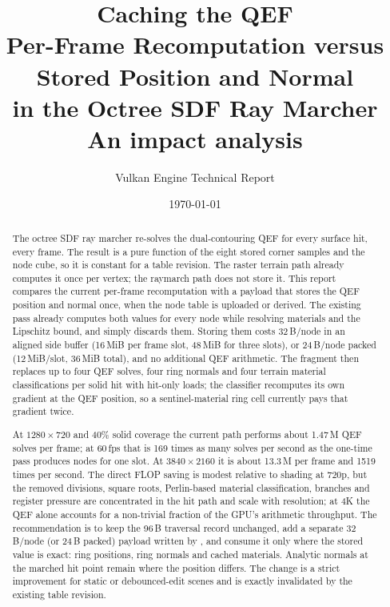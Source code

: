 \documentclass[11pt,a4paper]{article}
\title{\textbf{Caching the QEF}\\[6pt]
{\large Per-Frame Recomputation versus Stored Position and Normal\\
in the Octree SDF Ray Marcher}\\[8pt]
{\normalsize An impact analysis}}
\author{Vulkan Engine Technical Report}
\date{\today}
\newcommand{\fpath}[1]{\path{#1}}
\theoremstyle{plain}
\theoremstyle{definition}
\theoremstyle{remark}
\begin{document}
\maketitle

\begin{abstract}
The octree SDF ray marcher re-solves the dual-contouring QEF for every surface
hit, every frame. The result is a pure function of the eight stored corner
samples and the node cube, so it is constant for a table revision. The raster
terrain path already computes it once per vertex; the raymarch path does not
store it. This report compares the current per-frame recomputation with a
payload that stores the QEF position and normal once, when the node table is
uploaded or derived. The existing \fpath{OctreeDerive.comp} pass already
computes both values for every node while resolving materials and the
Lipschitz bound, and simply discards them. Storing them costs 32\,B/node in an
aligned side buffer (16\,MiB per frame
slot, 48\,MiB for three slots), or 24\,B/node packed (12\,MiB/slot, 36\,MiB
total), and no additional QEF arithmetic. The
fragment then replaces up to four QEF solves, four ring normals and four
terrain material classifications per solid hit with hit-only loads; the
classifier recomputes its own gradient at the QEF position, so a
sentinel-material ring cell currently pays that gradient twice.

At $1280\times720$ and 40\% solid coverage the current path performs about
1.47\,M QEF solves per frame; at 60\,fps that is 169 times as many solves per
second as the one-time pass produces nodes for one slot. At
$3840\times2160$ it is about
13.3\,M per frame and 1519 times per second. The direct FLOP saving is modest relative to
shading at 720p, but the removed divisions, square roots, Perlin-based
material classification, branches and register pressure are concentrated in
the hit path and scale with resolution; at 4K the QEF alone accounts for a
non-trivial fraction of the GPU's arithmetic throughput. The
recommendation is to keep the 96\,B traversal record unchanged, add a separate
32\,B/node (or 24\,B packed) payload written by \fpath{OctreeDerive.comp}, and
consume it only where the stored value is exact: ring positions, ring normals
and cached materials. Analytic normals at the marched hit point remain where
the position differs. The change is a strict improvement for static or
debounced-edit scenes and is exactly invalidated by the existing table
revision.
\end{abstract}
\end{document}
